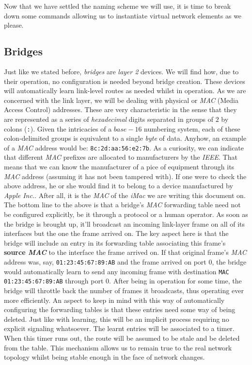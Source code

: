         Now that we have settled the naming scheme we will use, it is time to break down some commands allowing us to instantiate virtual network elements as we please.\\

        \subsection{Bridges}
            Just like we stated before, \textit{bridges} are \textit{layer 2} devices. We will find how, due to their operation, no configuration is needed beyond bridge creation. These devices will automatically learn link-level routes as needed whilst in operation. As we are concerned with the link layer, we will be dealing with physical or \textit{MAC} (Media Access Control) addresses. These are very characteristic in the sense that they are represented as a series of \textit{hexadecimal} digits separated in groups of $2$ by colons (\texttt{:}). Given the intricacies of a $base-16$ numbering system, each of these colon-delimited groups is equivalent to a single \textit{byte} of data. Anyhow, an example of a \textit{MAC} address would be: \texttt{8c:2d:aa:56:e2:7b}. As a curiosity, we can indicate that different \textit{MAC} prefixes are allocated to manufacturers by the \textit{IEEE}. That means that we can know the manufacturer of a pice of equipment through its \textit{MAC} address (assuming it has not been tampered with). If one were to check the above address, he or she would find it to belong to a device manufactured by \textit{Apple Inc.}. After all, it is the \textit{MAC} of the \textit{iMac} we are writing this document on.\\

            The bottom line to the above is that a bridge's \textit{MAC} forwarding table need not be configured explicitly, be it through a protocol or a human operator. As soon as the bridge is brought up, it'll broadcast an incoming link-layer frame on all of its interfaces but the one the frame arrived on. The key aspect here is that the bridge will include an entry in its forwarding table associating this frame's \textbf{source \textit{MAC}} to the interface the frame arrived on. If that original frame's \textit{MAC} address was, say, \texttt{01:23:45:67:89:AB} and the frame arrived on port $0$, the bridge would automatically learn to send any incoming frame with destination \texttt{MAC 01:23:45:67:89:AB} through port $0$. After being in operation for some time, the bridge will throttle back the number of frames it broadcasts, thus operating ever more efficiently. An aspect to keep in mind with this way of automatically configuring the forwarding tables is that these entries need some way of being deleted. Just like with learning, this will be an implicit process requiring no explicit signaling whatsoever. The learnt entries will be associated to a timer. When this timer runs out, the route will be assumed to be stale and be deleted from the table. This mechanism allows us to remain true to the real network topology whilst being stable enough in the face of network changes.\\

